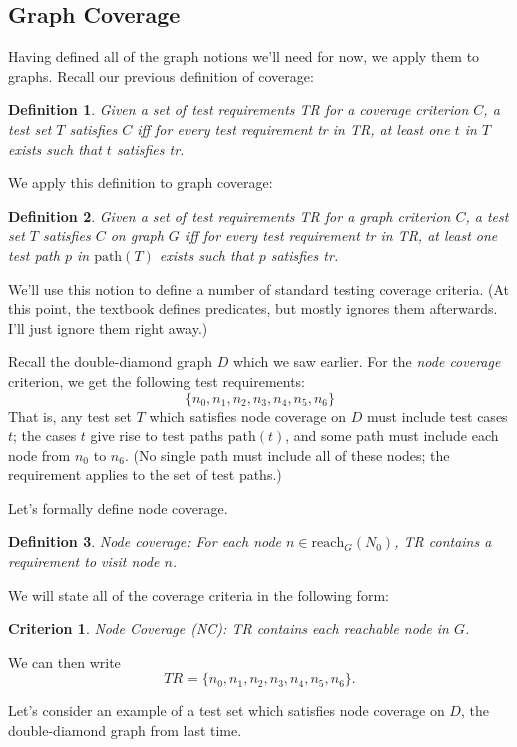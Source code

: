 \documentclass[11pt]{article}
\newtheorem{defn}{Definition}
\newtheorem{crit}{Criterion}
\begin{document}
\subsection*{Graph Coverage}
Having defined all of the graph notions we'll need for now, we apply them to
graphs. Recall our previous definition of coverage:
\begin{defn}
Given a set of test requirements \emph{TR} for a coverage criterion $C$, 
a test set $T$ \emph{satisfies} $C$ iff for every test requirement \emph{tr} in 
\emph{TR}, at least one $t$ in $T$ exists such that $t$ satisfies \emph{tr}.
\end{defn}

We apply this definition to graph coverage:
\begin{defn}
Given a set of test requirements \emph{TR} for a graph criterion $C$, 
a test set $T$ satisfies $C$ on graph $G$ iff for every test requirement
\emph{tr} in \emph{TR}, at least one test path $p$ in $\mbox{path}(T)$ 
exists such that $p$ satisfies \emph{tr}.
\end{defn}
We'll use this notion to define a number of standard testing
coverage criteria. (At this point, the textbook defines predicates, but
mostly ignores them afterwards. I'll just ignore them right away.)

Recall the double-diamond graph $D$ which we saw earlier.
For the \emph{node coverage} criterion, we get the following test requirements:
\[ \{ n_0, n_1, n_2, n_3, n_4, n_5, n_6 \} \]
That is, any test set $T$ which satisfies node coverage on $D$ must include
test cases $t$; the cases $t$ give rise to test paths $\mbox{path}(t)$, and
some path must include each node from $n_0$ to $n_6$. (No single path must
include all of these nodes; the requirement applies to the set of
test paths.)

Let's formally define node coverage.
\begin{defn}
Node coverage: For each node $n \in \mbox{reach}_G(N_0)$, \emph{TR} contains
a requirement to visit node $n$.
\end{defn}

We will state all of the coverage criteria in the following form:
\begin{crit}
Node Coverage (NC): \emph{TR} contains each reachable node in $G$.
\end{crit}

We can then write
\[ \mathit{TR} = \{ n_0, n_1, n_2, n_3, n_4, n_5, n_6\}. \]

Let's consider an example of a test set which satisfies node coverage
on $D$, the double-diamond graph from last time.
\end{document}
